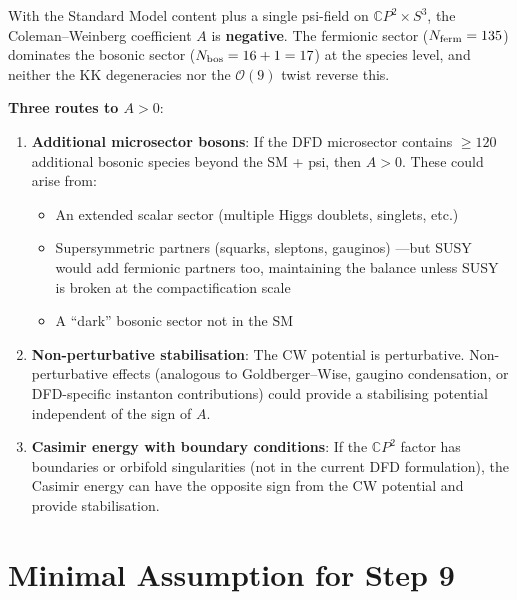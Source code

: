 \documentclass[11pt,a4paper]{article}
\newcommand{\CP}{\mathbb{C}P}
\newcommand{\Nbos}{N_{\rm bos}}
\newcommand{\Nferm}{N_{\rm ferm}}
\begin{document}
\begin{tcolorbox}[colback=red!5!white, colframe=red!70!black,
  title=\textbf{Honest Assessment}]

With the Standard Model content plus a single psi-field on
$\CP^2 \times S^3$, the Coleman--Weinberg coefficient $A$ is
\textbf{negative}. The fermionic sector ($\Nferm = 135$)
dominates the bosonic sector ($\Nbos = 16 + 1 = 17$) at the
species level, and neither the KK degeneracies nor the
$\mathcal{O}(9)$ twist reverse this.

\textbf{Three routes to $A > 0$}:

\begin{enumerate}
\item \textbf{Additional microsector bosons}: If the DFD
  microsector contains $\geq 120$ additional bosonic species
  beyond the SM + psi, then $A > 0$. These could arise from:
  \begin{itemize}[nosep]
  \item An extended scalar sector (multiple Higgs doublets,
    singlets, etc.)
  \item Supersymmetric partners (squarks, sleptons, gauginos)
    ---but SUSY would add fermionic partners too, maintaining
    the balance unless SUSY is broken at the compactification scale
  \item A ``dark'' bosonic sector not in the SM
  \end{itemize}

\item \textbf{Non-perturbative stabilisation}: The CW potential
  is perturbative. Non-perturbative effects (analogous to
  Goldberger--Wise, gaugino condensation, or DFD-specific
  instanton contributions) could provide a stabilising potential
  independent of the sign of $A$.

\item \textbf{Casimir energy with boundary conditions}: If the
  $\CP^2$ factor has boundaries or orbifold singularities (not
  in the current DFD formulation), the Casimir energy can have
  the opposite sign from the CW potential and provide
  stabilisation.
\end{enumerate}

\end{tcolorbox}


\part{Minimal Assumption for Step 9}
\label{part:minimal}
\end{document}
